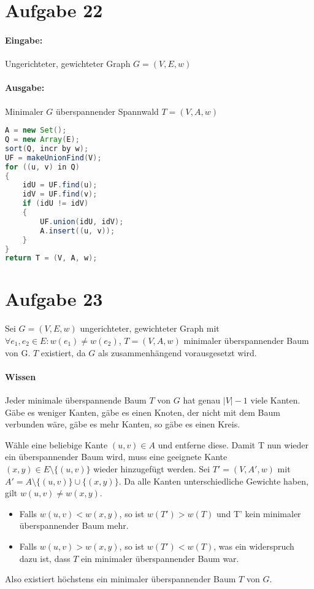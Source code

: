 \documentclass[10pt,a4paper]{article}
\begin{document}
\section*{Aufgabe 22}
	\paragraph{Eingabe:} Ungerichteter, gewichteter Graph $G=(V, E, w)$
	\paragraph{Ausgabe:} Minimaler $G$ überspannender Spannwald $T=(V, A, w)$
	\begin{lstlisting}[language=Java]
A = new Set();
Q = new Array(E);
sort(Q, incr by w);
UF = makeUnionFind(V);
for ((u, v) in Q)
{
	idU = UF.find(u);
	idV = UF.find(v);
	if (idU != idV)
	{
		UF.union(idU, idV);
		A.insert((u, v));
	}
}
return T = (V, A, w);
	\end{lstlisting}
	

\section*{Aufgabe 23}
Sei $G = (V, E, w)$ ungerichteter, gewichteter Graph mit $\forall e_1, e_2 \in E : w(e_1) \neq w(e_2)$, $T = (V, A, w)$ minimaler überspannender Baum von G. $T$ existiert, da $G$ als zusammenhängend vorausgesetzt wird.
\paragraph{Wissen} Jeder minimale überspannende Baum $T$ von $G$ hat genau $|V|-1$ viele Kanten. Gäbe es weniger Kanten, gäbe es einen Knoten, der nicht mit dem Baum verbunden wäre, gäbe es mehr Kanten, so gäbe es einen Kreis.

Wähle eine beliebige Kante $(u, v) \in A$ und entferne diese. Damit T nun wieder ein überspannender Baum wird, muss eine geeignete Kante $(x, y) \in E \setminus \{(u,v)\}$ wieder hinzugefügt werden.
Sei $T' = (V, A', w)$ mit $A' = A \setminus \{(u,v)\} \cup \{(x,y)\}$.
Da alle Kanten unterschiedliche Gewichte haben, gilt $w(u,v) \neq w(x, y)$.
\begin{itemize}
	\item Falls $w(u, v) < w(x, y)$, so ist $w(T') > w(T)$ und T' kein minimaler überspannender Baum mehr.
	\item Falls $w(u, v) > w(x, y)$, so ist $w(T') < w(T)$, was ein widerspruch dazu ist, dass $T$ ein minimaler überspannender Baum war.
\end{itemize}

Also existiert höchstens ein minimaler überspannender Baum $T$ von $G$.
\end{document}
